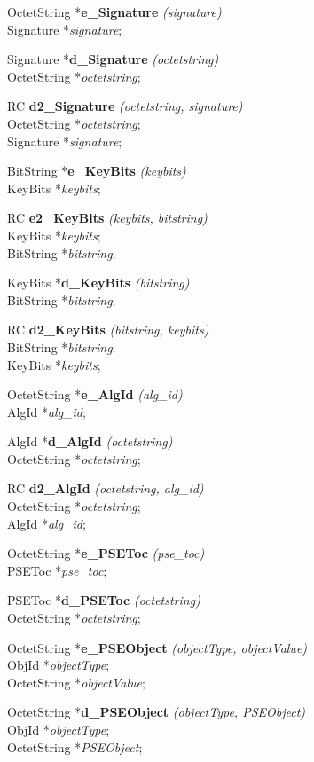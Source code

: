 OctetString *{\bf e\_Signature} {\em (signature)} \\
Signature *{\em signature}; 

Signature *{\bf d\_Signature} {\em (octetstring)} \\
OctetString *{\em octetstring}; 

RC {\bf d2\_Signature} {\em (octetstring, signature)} \\
OctetString *{\em octetstring}; \\
Signature *{\em signature}; 

BitString *{\bf e\_KeyBits} {\em (keybits)} \\
KeyBits *{\em keybits}; 

RC {\bf e2\_KeyBits} {\em (keybits, bitstring)} \\
KeyBits *{\em keybits}; \\
BitString *{\em bitstring}; 

KeyBits *{\bf d\_KeyBits} {\em (bitstring)} \\
BitString *{\em bitstring}; 

RC {\bf d2\_KeyBits} {\em (bitstring, keybits)} \\
BitString *{\em bitstring}; \\
KeyBits *{\em keybits}; 

OctetString *{\bf e\_AlgId} {\em (alg\_id)} \\
AlgId *{\em alg\_id}; 

AlgId *{\bf d\_AlgId} {\em (octetstring)} \\
OctetString *{\em octetstring}; 

RC {\bf d2\_AlgId} {\em (octetstring, alg\_id)} \\
OctetString *{\em octetstring}; \\
AlgId *{\em alg\_id}; 

OctetString *{\bf e\_PSEToc} {\em (pse\_toc)} \\
PSEToc *{\em pse\_toc}; 

PSEToc *{\bf d\_PSEToc} {\em (octetstring)} \\
OctetString *{\em octetstring}; 

OctetString *{\bf e\_PSEObject} {\em (objectType, objectValue)} \\
ObjId *{\em objectType}; \\
OctetString *{\em objectValue}; 

OctetString *{\bf d\_PSEObject} {\em (objectType, PSEObject)} \\
ObjId *{\em objectType}; \\
OctetString *{\em PSEObject}; 

